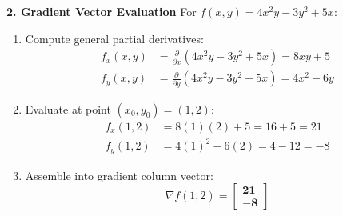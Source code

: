 \textbf{2. Gradient Vector Evaluation}
For $f(x, y) = 4x^2 y - 3y^2 + 5x$:
\begin{enumerate}
    \item Compute general partial derivatives:
    \begin{align*}
    f_x(x, y) &= \frac{\partial}{\partial x}(4x^2 y - 3y^2 + 5x) = 8xy + 5 \\
    f_y(x, y) &= \frac{\partial}{\partial y}(4x^2 y - 3y^2 + 5x) = 4x^2 - 6y
    \end{align*}
    \item Evaluate at point $(x_0, y_0) = (1, 2)$:
    \begin{align*}
    f_x(1, 2) &= 8(1)(2) + 5 = 16 + 5 = 21 \\
    f_y(1, 2) &= 4(1)^2 - 6(2) = 4 - 12 = -8
    \end{align*}
    \item Assemble into gradient column vector:
    \begin{equation*}
    \nabla f(1, 2) = \mathbf{\begin{bmatrix} 21 \\ -8 \end{bmatrix}}
    \end{equation*}
\end{enumerate}

